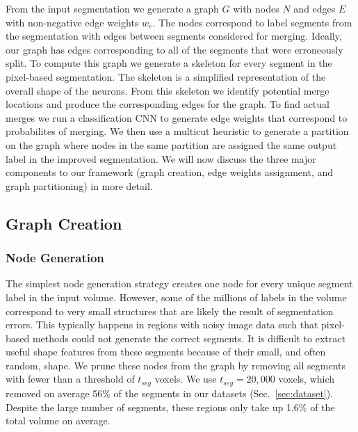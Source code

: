 From the input segmentation we generate a graph $G$ with nodes $N$ and edges $E$ with non-negative edge weights $w_e$. The nodes correspond to label segments from the segmentation with edges between segments considered for merging. Ideally, our graph has edges corresponding to all of the segments that were erroneously split. To compute this graph we generate a skeleton for every segment in the pixel-based segmentation. The skeleton is a simplified representation of the overall shape of the neurons. From this skeleton we  identify potential merge locations and produce the corresponding edges for the graph. To find actual merges we run a classification CNN to generate edge weights that correspond to probabilites of merging. We then use a multicut heuristic to generate a partition on the graph where nodes in the same partition are assigned the same output label in the improved segmentation. We will now discuss the three major components to our framework (graph creation, edge weights assignment, and graph partitioning) in more detail.

\subsection{Graph Creation}
\label{sec:skeletonization}

\subsubsection{Node Generation}

The simplest node generation strategy creates one node for every unique segment label in the input volume. However, some of the millions of labels in the volume correspond to very small structures that are likely the result of segmentation errors. This typically happens in regions with noisy image data such that pixel-based methods could not generate the correct segments. It is difficult to extract useful shape features from these segments because of their small, and often random, shape. We prune these nodes from the graph by removing all segments with fewer than a threshold of $t_{seg}$ voxels. We use $t_{seg} = 20,000$ voxels, which removed on average 56\% of the segments in our  datasets (Sec.~\ref{sec:dataset}). Despite the large number of segments, these regions only take up 1.6\% of the total volume on average. 


